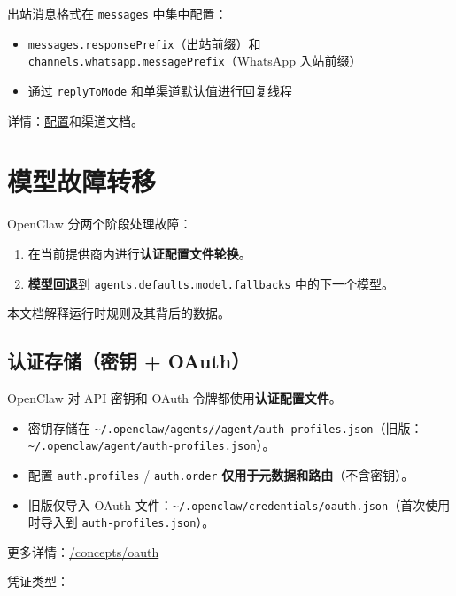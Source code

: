 出站消息格式在 \texttt{messages} 中集中配置：

\begin{itemize}
  \item \texttt{messages.responsePrefix}（出站前缀）和 \texttt{channels.whatsapp.messagePrefix}（WhatsApp 入站前缀）
  \item 通过 \texttt{replyToMode} 和单渠道默认值进行回复线程
\end{itemize}


详情：\href{/gateway/configuration\#messages}{配置}和渠道文档。


\clearpage

\section{模型故障转移}


OpenClaw 分两个阶段处理故障：

\begin{enumerate}
  \item 在当前提供商内进行\textbf{认证配置文件轮换}。
  \item \textbf{模型回退}到 \texttt{agents.defaults.model.fallbacks} 中的下一个模型。
\end{enumerate}


本文档解释运行时规则及其背后的数据。

\subsection{认证存储（密钥 + OAuth）}


OpenClaw 对 API 密钥和 OAuth 令牌都使用\textbf{认证配置文件}。

\begin{itemize}
  \item 密钥存储在 \texttt{\textasciitilde{}/.openclaw/agents//agent/auth-profiles.json}（旧版：\texttt{\textasciitilde{}/.openclaw/agent/auth-profiles.json}）。
  \item 配置 \texttt{auth.profiles} / \texttt{auth.order} \textbf{仅用于元数据和路由}（不含密钥）。
  \item 旧版仅导入 OAuth 文件：\texttt{\textasciitilde{}/.openclaw/credentials/oauth.json}（首次使用时导入到 \texttt{auth-profiles.json}）。
\end{itemize}


更多详情：\href{/concepts/oauth}{/concepts/oauth}

凭证类型：

